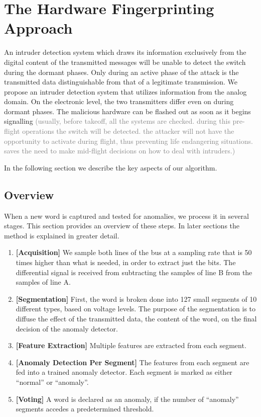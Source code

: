 \documentclass[conference]{IEEEtran}
\begin{document}
\section{The Hardware Fingerprinting Approach}
  An intruder detection system which draws its information exclusively from the digital content of the transmitted messages will be unable to detect the switch during the dormant phases. Only during an active phase of the attack is the transmitted data distinguishable from that of a legitimate transmission. We propose an intruder detection system that utilizes information from the analog domain. On the electronic level, the two transmitters differ even on during dormant phases. The malicious hardware can be flashed out as soon as it begins signalling \textcolor{gray}{(usually, before takeoff, all the systems are checked. during this pre-flight operations the switch will be detected. the attacker will not have the opportunity to activate during flight, thus preventing life endangering situations. saves the need to make mid-flight decisions on how to deal with intruders.)}
  
  In the following section we describe the key aspects of our algorithm.

\subsection{Overview} \label{Overview}
  When a new word is captured and tested for anomalies, we process it in several stages. This section provides an overview of these steps. In later sections the method is explained in greater detail.
  
  \begin{enumerate}
    \item \textbf{[Acquisition]}
          We sample both lines of the bus at a sampling rate that is 50 times higher than what is needed, in order to extract just the bits. The differential signal is received from subtracting the samples of line B from the samples of line A.
    \item \textbf{[Segmentation]}
          First, the word is broken done into 127 small segments of 10 different types, based on voltage levels. The purpose of the segmentation is to diffuse the effect of the transmitted data, the content of the word, on the final decision of the anomaly detector.
    \item \textbf{[Feature Extraction]}
          Multiple features are extracted from each segment. 
    \item \textbf{[Anomaly Detection Per Segment]}
          The features from each segment are fed into a trained anomaly detector. Each segment is marked as either ``normal'' or ``anomaly''.
    \item \textbf{[Voting]}
          A word is declared as an anomaly, if the number of ``anomaly'' segments accedes a predetermined threshold.
  \end{enumerate}
  
\end{document}
